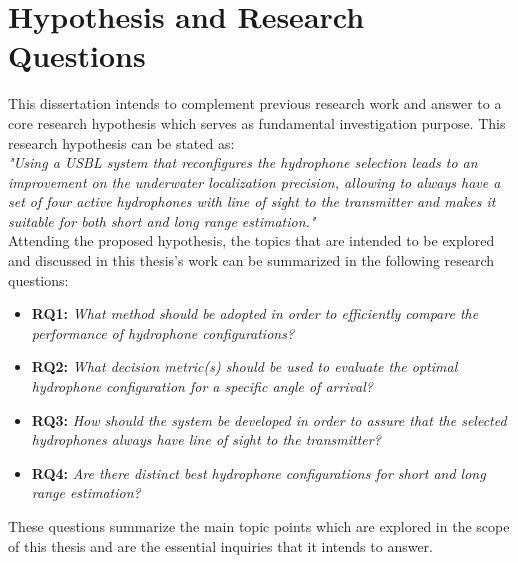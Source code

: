 \section{Hypothesis and Research Questions} \label{sec:hypoth-rq}

This dissertation intends to complement previous research work and answer to a core research hypothesis which serves as fundamental investigation purpose. This research hypothesis can be stated as:
\\

\textit{"Using a USBL system that reconfigures the hydrophone selection leads to an improvement on the underwater localization precision, allowing to always have a set of four active hydrophones with line of sight to the transmitter and makes it suitable for both short and long range estimation."}
\\

Attending the proposed hypothesis, the topics that are intended to be explored and discussed in this thesis's work can be summarized in the following research questions:

\begin{itemize}

	\item \textbf{RQ1: }\textit{What method should be adopted in order to efficiently compare the performance of hydrophone configurations?}
	
	\item \textbf{RQ2: }\textit{What decision metric(s) should be used to evaluate the optimal hydrophone configuration for a specific angle of arrival?}
	
	\item \textbf{RQ3: }\textit{How should the system be developed in order to assure that the selected hydrophones always have line of sight to the transmitter?}
	
	\item \textbf{RQ4: }\textit{Are there distinct best hydrophone configurations for short and long range estimation?}
	
\end{itemize}

These questions summarize the main topic points which are explored in the scope of this thesis and are the essential inquiries that it intends to answer.

